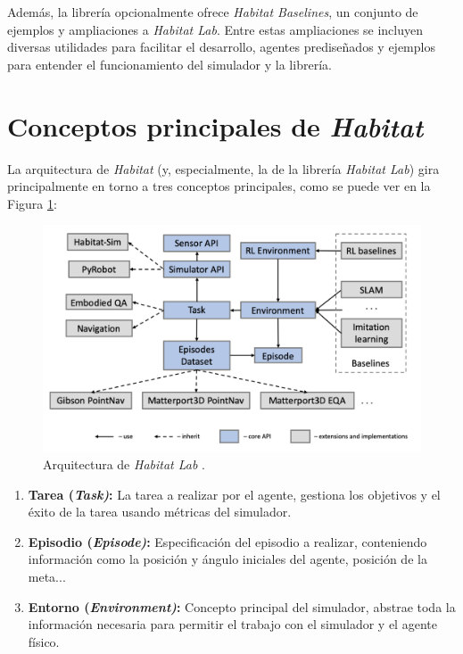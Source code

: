 Además, la librería opcionalmente ofrece \textit{Habitat Baselines}, un conjunto de ejemplos y ampliaciones a \textit{Habitat Lab}. Entre estas ampliaciones se incluyen diversas utilidades para facilitar el desarrollo, agentes prediseñados y ejemplos para entender el funcionamiento del simulador y la librería.


\section{Conceptos principales de \textit{Habitat}}

La arquitectura de \textit{Habitat} (y, especialmente, la de la librería \textit{Habitat Lab}) gira principalmente en torno a tres conceptos principales, como se puede ver en la Figura \ref{fig:chap4-habitat}:

\begin{figure}[h]
    \centering
    \includegraphics[width=\textwidth]{imagenes/cap4/habitat_lab_structure.png}
    \caption{Arquitectura de \textit{Habitat Lab} \cite{habitat19iccv}.}
    \label{fig:chap4-habitat}
\end{figure}

\begin{enumerate}
	\item \textbf{Tarea (\textit{Task)}:} La tarea a realizar por el agente, gestiona los objetivos y el éxito de la tarea usando métricas del simulador.
	\item \textbf{Episodio (\textit{Episode)}:} Especificación del episodio a realizar, conteniendo información como la posición y ángulo iniciales del agente, posición de la meta...
	\item \textbf{Entorno (\textit{Environment)}:} Concepto principal del simulador, abstrae toda la información necesaria para permitir el trabajo con el simulador y el agente físico.
\end{enumerate}

